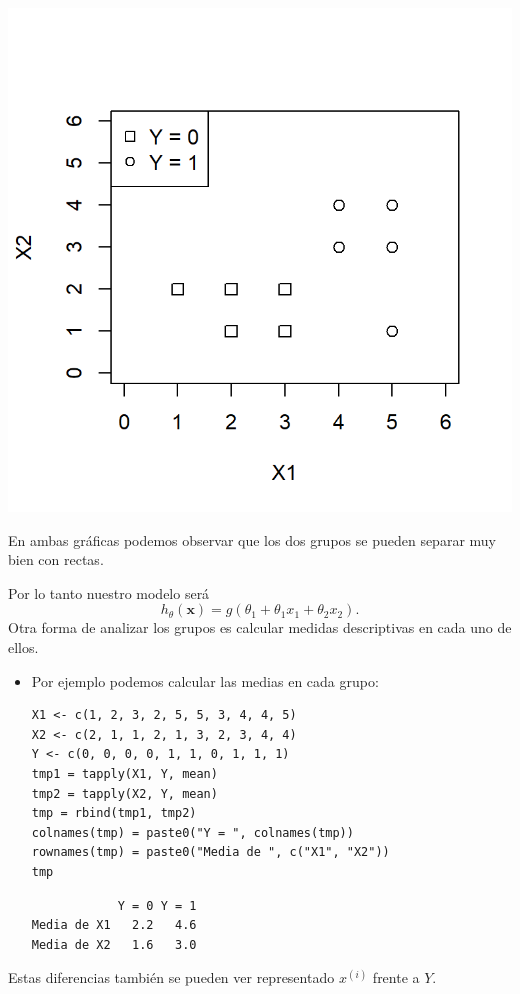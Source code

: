 \begin{minipage}{0.5\textwidth}
\begin{center}
	\includegraphics[width=\linewidth]{"Temas/Imágenes/Tema 3/screenshot004"}
\end{center}
\end{minipage}

En ambas gráficas podemos observar que los dos grupos se pueden separar muy bien con rectas.

Por lo tanto nuestro modelo será \[ h_\theta(\mathbf{x})=g(\theta_1+\theta_1x_1+\theta_2x_2). \]
Otra forma de analizar los grupos es calcular medidas descriptivas en cada uno de ellos.
\begin{itemize}
	\item Por ejemplo podemos calcular las medias en cada grupo:
	\pagebreak
	\begin{lstlisting}
X1 <- c(1, 2, 3, 2, 5, 5, 3, 4, 4, 5)
X2 <- c(2, 1, 1, 2, 1, 3, 2, 3, 4, 4)
Y <- c(0, 0, 0, 0, 1, 1, 0, 1, 1, 1)
tmp1 = tapply(X1, Y, mean)
tmp2 = tapply(X2, Y, mean)
tmp = rbind(tmp1, tmp2)
colnames(tmp) = paste0("Y = ", colnames(tmp))
rownames(tmp) = paste0("Media de ", c("X1", "X2"))
tmp
	\end{lstlisting}
	\begin{verbatim}
            Y = 0 Y = 1
Media de X1   2.2   4.6
Media de X2   1.6   3.0
	\end{verbatim}
\end{itemize}
Estas diferencias también se pueden ver representado $x^{(i)}$ frente a $Y$.

